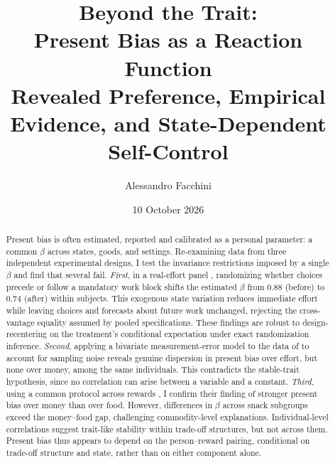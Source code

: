 \documentclass[11pt,a4paper]{article}
\title{\textbf{Beyond the Trait:\\Present Bias as a Reaction Function}\\[4pt] %
\large Revealed Preference, %
Empirical Evidence, and State-Dependent Self-Control}
\author{Alessandro Facchini
}
\date{10 October 2026}
\theoremstyle{plain}
\theoremstyle{definition}
\begin{document}
\maketitle

\begin{abstract}
\noindent
Present bias is often estimated, reported and calibrated as a personal parameter: a common $\beta$ across states, goods, and settings.
Re-examining data from three independent experimental designs, I test the invariance restrictions imposed by a single $\beta$ and find that several fail.
\emph{First}, in a real-effort panel \citep{augenblick2019}, randomizing whether choices precede or follow a mandatory work block shifts the estimated $\beta$ from $0.88$ (before) to $0.74$ (after) within subjects.
This exogenous state variation reduces immediate effort while leaving choices and forecasts about future work unchanged, rejecting the cross-vantage equality assumed by pooled specifications.
These findings are robust to design-recentering on the treatment's conditional expectation under exact randomization inference.
\emph{Second}, applying a bivariate measurement-error model to the data of \citet{ans2015} to account for sampling noise reveals genuine dispersion in present bias over effort, but none over money, among the same individuals.
This contradicts the stable-trait hypothesis, since no correlation can arise between a variable and a constant.
\emph{Third}, using a common protocol across rewards \citep{cheung2022}, %
I confirm their finding of stronger present bias over money than over food.
However, differences in $\beta$ across snack subgroups exceed the money--food gap, challenging commodity-level explanations.
Individual-level correlations suggest trait-like stability within trade-off structures, but not across them.
Present bias thus appears to depend on the person--reward pairing, conditional on trade-off structure and state, rather than on either component alone. 

\end{abstract}
\end{document}
